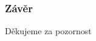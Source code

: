\documentclass{beamer}
\begin{document}
  \begin{frame}
    \frametitle{Závěr}
    \begin{center}
      Děkujeme za pozornost
    \end{center}
  \end{frame}
\end{document}
